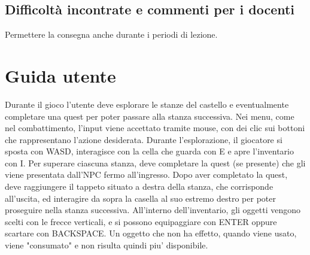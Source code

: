 \documentclass[a4paper,12pt]{report}
\begin{document}
\section{Difficoltà incontrate e commenti per i docenti}

Permettere la consegna anche durante i periodi di lezione.

\appendix
\chapter{Guida utente}

Durante il gioco l'utente deve esplorare le stanze del castello e eventualmente completare una quest per poter passare alla stanza successiva.
\newline Nei menu, come nel combattimento, l'input viene accettato tramite mouse, con dei clic sui bottoni che rappresentano l'azione desiderata.
\newline Durante l'esplorazione, il giocatore si sposta con WASD, interagisce con la cella che guarda con E e apre l'inventario con I.
\newline Per superare ciascuna stanza, deve completare la quest (se presente) che gli viene presentata dall'NPC fermo all'ingresso. Dopo aver completato la quest, deve raggiungere il tappeto situato a destra della stanza, che corrisponde all'uscita, ed interagire da sopra la casella al suo estremo destro per poter proseguire nella stanza successiva.
\newline All'interno dell'inventario, gli oggetti vengono scelti con le frecce verticali, e si possono equipaggiare con ENTER oppure scartare con BACKSPACE. Un oggetto che non ha effetto, quando viene usato, viene "consumato" e non risulta quindi piu' disponibile.



\end{document}
